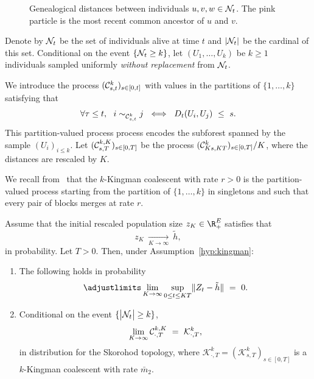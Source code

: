 \begin{refsegment}
\begin{figure}[h!]
{\begin{tikzpicture}[x=0.75pt,y=0.75pt,yscale=-1,xscale=1]
\end{tikzpicture}}
    \caption{Genealogical distances between individuals $u,v,w\in {\cal N}_t$. The pink particle is the most recent common ancestor of $u$ and $v$.}
    \label{fig:distance_gen}
\end{figure}

Denote by ${\cal N}_t$ be the set of individuals alive at time $t$ and $|{\cal N}_t|$ be the cardinal of this set.
Conditional on the event $\{{\cal N}_t\geq k\}$, let 
$(U_1, \dots, U_k)$ be $k\geq 1$ individuals
sampled uniformly \emph{without replacement} from ${\cal N}_t$.

We introduce the process
$({\cal C}^{k}_{s,t})_{s \in [0, t]}$ with values in the partitions of
$\{1,\dots, k\}$ satisfying that
\[
    \forall \tau\leq t, \ \ i \sim_{{\cal C}^{k}_{s,t}} j\ \iff\
  D_{t}(U_i, U_j)\ \leq\  s.
\]
This partition-valued process process encodes the subforest spanned by the sample $(U_i)_{i \leq k}$. Let $({\cal C}^{k,K}_{s,T})_{s \in [0,T]}$ be the process $({\cal C}^{k}_{Ks,KT})_{s\in [0,T]}/K$, where the distances are rescaled by $K$.

\medskip

We recall from~\cite{Kingman:1982aa} that the $k$-Kingman coalescent with rate $r>0$ is the partition-valued process starting from the partition of $\{1,\ldots, k\}$ in singletons and such that every pair of blocks merges at rate $r$.
\begin{thm}[Convergence of the genealogies]\label{thm:main_multitype}
     Assume that the initial rescaled population size $z_K\in \R_+^E$ satisfies that
     \[z_K\ \underset{K\to\infty}{\longrightarrow}\ \tilde h,\]
     in probability. Let $T>0$. Then, under Assumption~\ref{hyp:kingman}:
         \begin{enumerate}
    \item[(i)] The following holds in probability
        \[
            \adjustlimits\lim_{K \to \infty} \sup_{0 \leq t \leq KT}  \lVert Z_t - \tilde h\rVert \ =\ 0.
        \]
    \item[(ii)] Conditional on  the event 
    $\{\big| {\cal N}_t\big| \geq k\}$, 
    \[
        \lim_{K \to \infty} {\cal C}^{k,K}_{\cdot, T}
       \ =\ \mathcal{K}^k_{\cdot ,T},
    \]
    in distribution for the Skorohod topology, where $\mathcal{K}^k_{\cdot ,T}=(\mathcal{K}^k_{s,T})_{ s \in [0, T]}$ is a $k$-Kingman coalescent with rate $\bar m_2$. 
    \end{enumerate}
\end{thm}


\end{refsegment}
